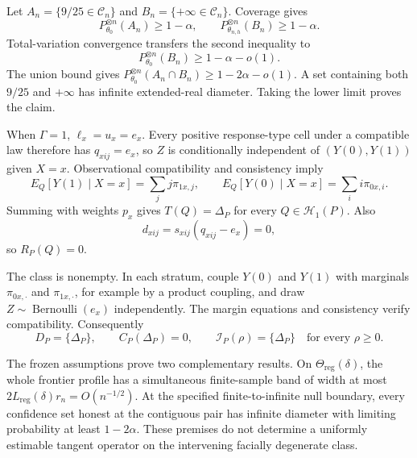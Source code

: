 Let \(A_n=\{9/25\in\mathcal C_n\}\) and \(B_n=\{+\infty\in\mathcal C_n\}\). Coverage gives
\[
P_{\theta_0}^{\otimes n}(A_n)\geq1-\alpha,\qquad
P_{\theta_{n,h}}^{\otimes n}(B_n)\geq1-\alpha. \tag{67}
\]
Total-variation convergence transfers the second inequality to
\[
P_{\theta_0}^{\otimes n}(B_n)\geq1-\alpha-o(1). \tag{68}
\]
The union bound gives \(P_{\theta_0}^{\otimes n}(A_n\cap B_n)\geq1-2\alpha-o(1)\). A set containing both \(9/25\) and \(+\infty\) has infinite extended-real diameter. Taking the lower limit proves the claim.

When \(\Gamma=1\), \(\ell_x=u_x=e_x\). Every positive response-type cell under a compatible law therefore has \(q_{xij}=e_x\), so \(Z\) is conditionally independent of \((Y(0),Y(1))\) given \(X=x\). Observational compatibility and consistency imply
\[
E_Q[Y(1)\mid X=x]=\sum_jj\pi_{1x,j},\qquad
E_Q[Y(0)\mid X=x]=\sum_ii\pi_{0x,i}. \tag{69}
\]
Summing with weights \(p_x\) gives \(T(Q)=\Delta_P\) for every \(Q\in\mathcal H_1(P)\). Also
\[
d_{xij}=s_{xij}(q_{xij}-e_x)=0,
\]
so \(R_P(Q)=0\).

The class is nonempty. In each stratum, couple \(Y(0)\) and \(Y(1)\) with marginals \(\pi_{0x,\cdot}\) and \(\pi_{1x,\cdot}\), for example by a product coupling, and draw \(Z\sim\operatorname{Bernoulli}(e_x)\) independently. The margin equations and consistency verify compatibility. Consequently
\[
D_P=\{\Delta_P\},\qquad C_P(\Delta_P)=0,\qquad
\mathcal I_P(\rho)=\{\Delta_P\}\quad\text{for every }\rho\geq0.
\]

The frozen assumptions prove two complementary results. On \(\Theta_{\mathrm{reg}}(\delta)\), the whole frontier profile has a simultaneous finite-sample band of width at most \(2L_{\mathrm{reg}}(\delta)r_n=O(n^{-1/2})\). At the specified finite-to-infinite null boundary, every confidence set honest at the contiguous pair has infinite diameter with limiting probability at least \(1-2\alpha\). These premises do not determine a uniformly estimable tangent operator on the intervening facially degenerate class.

